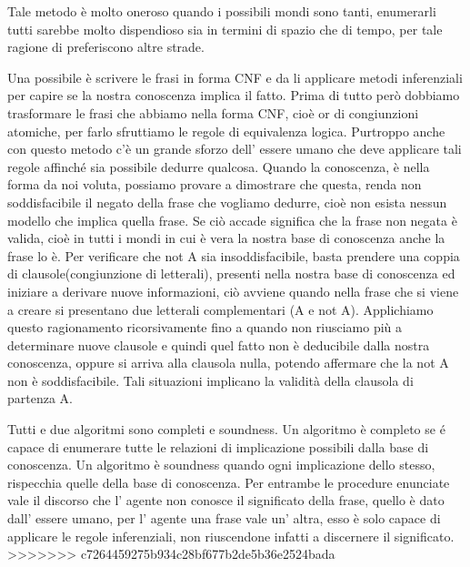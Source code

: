 		\par
		Tale metodo è molto oneroso quando i possibili mondi sono tanti, enumerarli tutti sarebbe molto dispendioso sia in termini di spazio che di tempo, per tale ragione di preferiscono altre strade.
		\par
		Una possibile è scrivere le frasi in forma CNF e da li applicare metodi inferenziali per capire se la nostra conoscenza implica il fatto. 
		Prima di tutto però dobbiamo trasformare le frasi che abbiamo nella forma CNF, cioè or di congiunzioni atomiche, per farlo sfruttiamo le regole di equivalenza logica. Purtroppo anche con questo metodo c'è un grande sforzo dell' essere umano che deve applicare tali regole affinché sia possibile dedurre qualcosa.
		Quando la conoscenza, è nella forma da noi voluta, possiamo provare a dimostrare che questa, renda non soddisfacibile il negato della frase che vogliamo dedurre, cioè non esista nessun modello che implica quella frase. Se ciò accade significa che la frase non negata è valida, cioè in tutti i mondi in cui è vera la nostra base di conoscenza anche la frase lo è. Per verificare che not A sia insoddisfacibile, basta prendere una coppia di clausole(congiunzione di letterali), presenti nella nostra base di conoscenza ed iniziare a derivare nuove informazioni, ciò avviene quando nella frase che si viene a creare si presentano due letterali complementari (A e not A).
		Applichiamo questo ragionamento ricorsivamente fino a quando non riusciamo più a determinare nuove clausole e quindi quel fatto non è deducibile dalla nostra conoscenza, oppure si arriva alla clausola nulla, potendo affermare che la not A non è soddisfacibile.
		Tali situazioni implicano la validità della clausola di partenza A.
		\par
		Tutti e due algoritmi sono completi e soundness.
		Un algoritmo è completo se é capace di enumerare tutte le relazioni di implicazione possibili dalla base di conoscenza.
		Un algoritmo è soundness quando ogni implicazione dello stesso, rispecchia quelle della base di conoscenza.
		Per entrambe le procedure enunciate vale il discorso che l' agente non conosce il significato della frase, quello è dato dall' essere umano, per l' agente una frase vale un' altra, esso è solo capace di applicare le regole inferenziali, non riuscendone infatti a discernere il significato.
>>>>>>> c7264459275b934c28bf677b2de5b36e2524bada
		
